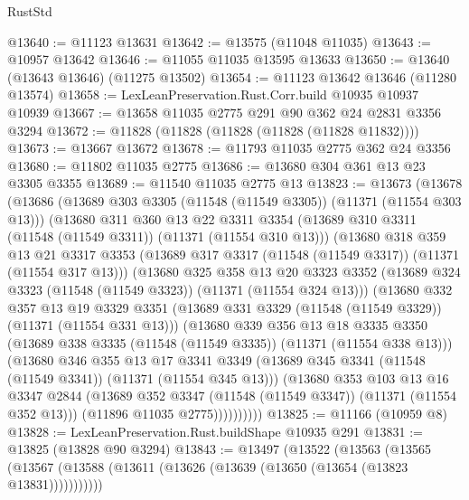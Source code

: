 \begin{lexlean}{RustStd}
\begin{coremodule}
{\begin{coremodule}
{{{{{{{{{{{{{{{{{{{{{{{{{{{{{{{{{@13640 := @11123 @13631
@13642 := @13575 (@11048 @11035)
@13643 := @10957 @13642
@13646 := @11055 @11035 @13595 @13633
@13650 := @13640 (@13643 @13646) (@11275 @13502)
@13654 := @11123 @13642 @13646 (@11280 @13574)
@13658 := LexLeanPreservation.Rust.Corr.build @10935 @10937 @10939
@13667 := @13658 @11035 @2775 @291 @90 @362 @24 @2831 @3356 @3294
@13672 := @11828 (@11828 (@11828 (@11828 (@11828 @11832))))
@13673 := @13667 @13672
@13678 := @11793 @11035 @2775 @362 @24 @3356
@13680 := @11802 @11035 @2775
@13686 := @13680 @304 @361 @13 @23 @3305 @3355
@13689 := @11540 @11035 @2775 @13
@13823 := @13673
    (@13678
      (@13686
        (@13689 @303 @3305 (@11548 (@11549 @3305)) (@11371 (@11554 @303 @13)))
        (@13680
          @311
          @360
          @13
          @22
          @3311
          @3354
          (@13689 @310 @3311 (@11548 (@11549 @3311)) (@11371 (@11554 @310 @13)))
          (@13680
            @318
            @359
            @13
            @21
            @3317
            @3353
            (@13689 @317 @3317 (@11548 (@11549 @3317)) (@11371 (@11554 @317 @13)))
            (@13680
              @325
              @358
              @13
              @20
              @3323
              @3352
              (@13689 @324 @3323 (@11548 (@11549 @3323)) (@11371 (@11554 @324 @13)))
              (@13680
                @332
                @357
                @13
                @19
                @3329
                @3351
                (@13689 @331 @3329 (@11548 (@11549 @3329)) (@11371 (@11554 @331 @13)))
                (@13680
                  @339
                  @356
                  @13
                  @18
                  @3335
                  @3350
                  (@13689 @338 @3335 (@11548 (@11549 @3335)) (@11371 (@11554 @338 @13)))
                  (@13680
                    @346
                    @355
                    @13
                    @17
                    @3341
                    @3349
                    (@13689 @345 @3341 (@11548 (@11549 @3341)) (@11371 (@11554 @345 @13)))
                    (@13680
                      @353
                      @103
                      @13
                      @16
                      @3347
                      @2844
                      (@13689 @352 @3347 (@11548 (@11549 @3347)) (@11371 (@11554 @352 @13)))
                      (@11896 @11035 @2775))))))))))
@13825 := @11166 (@10959 @8)
@13828 := LexLeanPreservation.Rust.buildShape @10935 @291
@13831 := @13825 (@13828 @90 @3294)
@13843 := @13497
    (@13522
      (@13563
        (@13565 (@13567 (@13588 (@13611 (@13626 (@13639 (@13650 (@13654 (@13823 @13831)))))))))))
}}}}}}}}}}}}}}}}}}}}}}}}}}}}}}}}}
\end{coremodule}}
\end{coremodule}
\end{lexlean}
